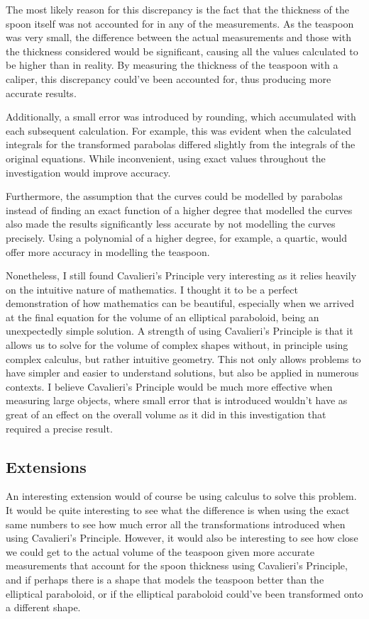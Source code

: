 \documentclass[12pt]{article}
\begin{document}
The most likely reason for this discrepancy is the fact that the thickness of the spoon itself was not accounted for in any of the measurements. As the teaspoon was very small, the difference between the actual measurements and those with the thickness considered would be significant, causing all the values calculated to be higher than in reality. By measuring the thickness of the teaspoon with a caliper, this discrepancy could've been accounted for, thus producing more accurate results. 

Additionally, a small error was introduced by rounding, which accumulated with each subsequent calculation. For example, this was evident when the calculated integrals for the transformed parabolas differed slightly from the integrals of the original equations. While inconvenient, using exact values throughout the investigation would improve accuracy. 

Furthermore, the assumption that the curves could be modelled by parabolas instead of finding an exact function of a higher degree that modelled the curves also made the results significantly less accurate by not modelling the curves precisely. Using a polynomial of a higher degree, for example, a quartic, would offer more accuracy in modelling the teaspoon. 

Nonetheless, I still found Cavalieri's Principle very interesting as it relies heavily on the intuitive nature of mathematics. I thought it to be a perfect demonstration of how mathematics can be beautiful, especially when we arrived at the final equation for the volume of an elliptical paraboloid, being an unexpectedly simple solution. A strength of using Cavalieri's Principle is that it allows us to solve for the volume of complex shapes without, in principle using complex calculus, but rather intuitive geometry. This not only allows problems to have simpler and easier to understand solutions, but also be applied in numerous contexts. I believe Cavalieri's Principle would be much more effective when measuring large objects, where small error that is introduced wouldn't have as great of an effect on the overall volume as it did in this investigation that required a precise result. 

\subsection{Extensions}

An interesting extension would of course be using calculus to solve this problem. It would be quite interesting to see what the difference is when using the exact same numbers to see how much error all the transformations introduced when using Cavalieri's Principle. However, it would also be interesting to see how close we could get to the actual volume of the teaspoon given more accurate measurements that account for the spoon thickness using Cavalieri's Principle, and if perhaps there is a shape that models the teaspoon better than the elliptical paraboloid, or if the elliptical paraboloid could've been transformed onto a different shape.
\end{document}
